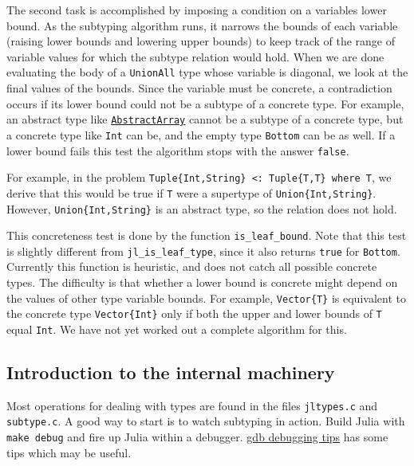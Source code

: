 The second task is accomplished by imposing a condition on a variable{\textquotesingle}s lower bound. As the subtyping algorithm runs, it narrows the bounds of each variable (raising lower bounds and lowering upper bounds) to keep track of the range of variable values for which the subtype relation would hold. When we are done evaluating the body of a \texttt{UnionAll} type whose variable is diagonal, we look at the final values of the bounds. Since the variable must be concrete, a contradiction occurs if its lower bound could not be a subtype of a concrete type. For example, an abstract type like \hyperlink{6514416309183787338}{\texttt{AbstractArray}} cannot be a subtype of a concrete type, but a concrete type like \texttt{Int} can be, and the empty type \texttt{Bottom} can be as well. If a lower bound fails this test the algorithm stops with the answer \texttt{false}.



For example, in the problem \texttt{Tuple\{Int,String\} <: Tuple\{T,T\} where T}, we derive that this would be true if \texttt{T} were a supertype of \texttt{Union\{Int,String\}}. However, \texttt{Union\{Int,String\}} is an abstract type, so the relation does not hold.



This concreteness test is done by the function \texttt{is\_leaf\_bound}. Note that this test is slightly different from \texttt{jl\_is\_leaf\_type}, since it also returns \texttt{true} for \texttt{Bottom}. Currently this function is heuristic, and does not catch all possible concrete types. The difficulty is that whether a lower bound is concrete might depend on the values of other type variable bounds. For example, \texttt{Vector\{T\}} is equivalent to the concrete type \texttt{Vector\{Int\}} only if both the upper and lower bounds of \texttt{T} equal \texttt{Int}. We have not yet worked out a complete algorithm for this.



\hypertarget{37604590457653524}{}


\subsection{Introduction to the internal machinery}



Most operations for dealing with types are found in the files \texttt{jltypes.c} and \texttt{subtype.c}. A good way to start is to watch subtyping in action. Build Julia with \texttt{make debug} and fire up Julia within a debugger. \href{@ref}{gdb debugging tips} has some tips which may be useful.



